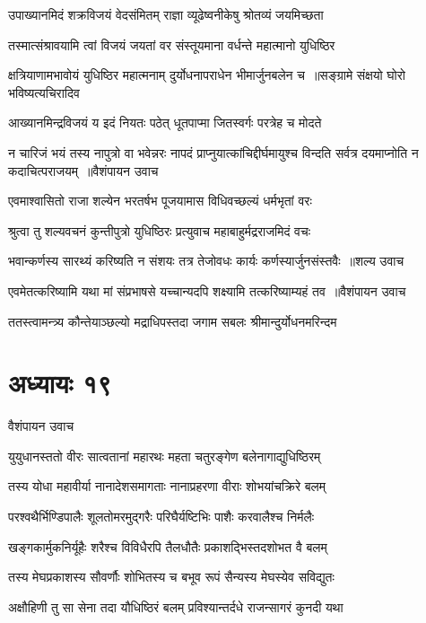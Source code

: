 \threelineshloka
{उपाख्यानमिदं शक्रविजयं वेदसंमितम्}
{राज्ञा व्यूढेष्वनीकेषु श्रोतव्यं जयमिच्छता}
{}


\twolineshloka
{तस्मात्संश्रावयामि त्वां विजयं जयतां वर}
{संस्तूयमाना वर्धन्ते महात्मानो युधिष्ठिर}


\twolineshloka
{क्षत्रियाणामभावोयं युधिष्ठिर महात्मनाम्}
{दुर्योधनापराधेन भीमार्जुनबलेन च ॥सङ्ग्रामे संक्षयो घोरो भविष्यत्यचिरादिव}


\twolineshloka
{आख्यानमिन्द्रविजयं य इदं नियतः पठेत्}
{धूतपाप्मा जितस्वर्गः परत्रेह च मोदते}


\fourlineindentedshloka
{न चारिजं भयं तस्य नापुत्रो वा भवेन्नरः}
{नापदं प्राप्नुयात्कांचिद्दीर्घमायुश्च विन्दति}
{सर्वत्र दयमाप्नोति न कदाचित्पराजयम् ॥वैशंपायन उवाच}
{}


\twolineshloka
{एवमाश्वासितो राजा शल्येन भरतर्षभ}
{पूजयामास विधिवच्छल्यं धर्मभृतां वरः}


\twolineshloka
{श्रुत्वा तु शल्यवचनं कुन्तीपुत्रो युधिष्ठिरः}
{प्रत्युवाच महाबाहुर्मद्रराजमिदं वचः}


\threelineshloka
{भवान्कर्णस्य सारथ्यं करिष्यति न संशयः}
{तत्र तेजोवधः कार्यः कर्णस्यार्जुनसंस्तवैः ॥शल्य उवाच}
{}


\threelineshloka
{एवमेतत्करिष्यामि यथा मां संप्रभाषसे}
{यच्चान्यदपि शक्ष्यामि तत्करिष्याम्यहं तव ॥वैशंपायन उवाच}
{}


\twolineshloka
{ततस्त्वामन्त्र्य कौन्तेयाञ्छल्यो मद्राधिपस्तदा}
{जगाम सबलः श्रीमान्दुर्योधनमरिन्दम}


\chapter{अध्यायः १९}
\twolineshloka
{वैशंपायन उवाच}
{}


\twolineshloka
{युयुधानस्ततो वीरः सात्वतानां महारथः}
{महता चतुरङ्गेण बलेनागाद्युधिष्ठिरम्}


\twolineshloka
{तस्य योधा महावीर्या नानादेशसमागताः}
{नानाप्रहरणा वीराः शोभयांचक्रिरे बलम्}


\twolineshloka
{परश्वथैर्भिण्डिपालैः शूलतोमरमुद्गरैः}
{परिघैर्यष्टिभिः पाशैः करवालैश्च निर्मलैः}


\twolineshloka
{खङ्गकार्मुकनिर्यूहैः शरैश्च विविधैरपि}
{तैलधौतैः प्रकाशद्भिस्तदशोभत वै बलम्}


\twolineshloka
{तस्य मेघप्रकाशस्य सौवर्णौः शोभितस्य च}
{बभूव रूपं सैन्यस्य मेघस्येव सविद्युतः}


\twolineshloka
{अक्षौहिणी तु सा सेना तदा यौधिष्ठिरं बलम्}
{प्रविश्यान्तर्दधे राजन्सागरं कुनदी यथा}


